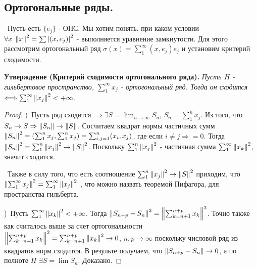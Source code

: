 \subsection*{Ортогональные ряды.}

\noindent \textbullet~Пусть есть $\{ e_j \}$ - ОНС. Мы хотим понять, при каком условии $\forall x \; \left\lVert x\right\rVert^2 = \sum \left\lvert(x, e_j)\right\rvert^2$ - выполняется уравнение замкнутости.
Для этого рассмотрим ортогональный ряд $\sigma(x) = \sum_1^\infty (x, e_j) e_j$ и установим критерий сходимости. 

\bigskip 
\noindent\textbf{Утверждение \textnormal{(Критерий сходимости ортогонального ряда)}.} \textit{Пусть $H$ - гильбертовое пространство, $\sum_1^\infty x_j$ -
ортогональный ряд. Тогда он сходится $\Longleftrightarrow \sum_1^\infty \left\lVert x_j\right\rVert^2 < +\infty$.} 

\begin{proof}

\smallskip
{})~Пусть ряд сходится $\Rightarrow \exists S = \lim_{n \to \infty} S_n$, $S_n = \sum_1^n x_j$. Из того, что $S_n \to S \Rightarrow \left\lVert S_n\right\rVert \to \left\lVert S\right\rVert$.
Сосчитаем квадрат нормы частичных сумм $\left\lVert S_n\right\rVert^2 = \left(\sum_1^n x_j , \sum_1^n x_j\right) = \sum_{i, j = 1}^n (x_i, x_j)$, где если $i \neq j \Rightarrow = 0$.
Тогда $\left\lVert S_n\right\rVert^2 = \sum_1^n \left\lVert x_j\right\rVert^2 \to \left\lVert S\right\rVert^2$. Поскольку $\sum_1^n \left\lVert x_j\right\rVert^2$ - частичная сумма $\sum_1^\infty \left\lVert x_k\right\rVert^2$, значит сходится. 

\medskip
\noindent \textbullet~Также в силу того, что есть соотношение $\sum_1^n \left\lVert x_j\right\rVert^2 \to \left\lVert S\right\rVert^2$ приходим, что $\left\lVert\sum_1^\infty x_j\right\rVert^2 = \sum_1^\infty \left\lVert x_j\right\rVert^2$
, что можно назвать теоремой Пифагора, для пространства гильберта.

)~Пусть $\sum_1^\infty \left\lVert x_k\right\rVert^2 < +\infty$. Тогда $\left\lVert S_{n+p} - S_n\right\rVert^2 = \left\lVert\sum_{k = n + 1}^{n + p} x_k\right\rVert^2$. Точно также как считалось выше за счет 
ортогональности $\left\lVert\sum_{k = n + 1}^{n + p} x_k\right\rVert^2 = \sum_{k = n + 1}^{n+p} \left\lVert x_k\right\rVert^2 \to 0$, $n, p \to \infty$ поскольку числовой ряд из квадратов норм сходится.
В результе получаем, что $\left\lVert S_{n +p} - S_n\right\rVert \to 0$, а по полноте $H$ $\exists S = \lim S_n$. Доказано.
\end{proof}